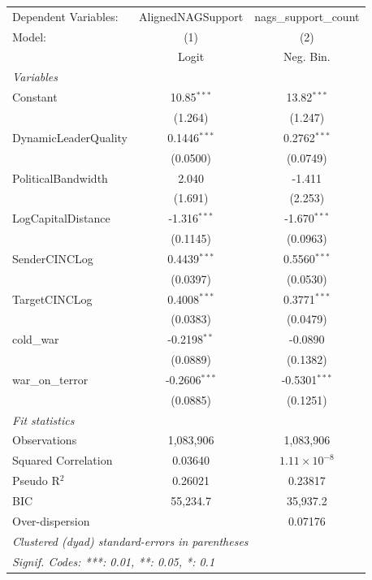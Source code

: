 
\begingroup
\centering
\begin{tabular}{lcc}
   \tabularnewline \midrule \midrule
   Dependent Variables: & AlignedNAGSupport & nags\_support\_count\\    
   Model:               & (1)               & (2)\\  
                        &  Logit            & Neg. Bin.\\  
   \midrule
   \emph{Variables}\\
   Constant             & 10.85$^{***}$     & 13.82$^{***}$\\   
                        & (1.264)           & (1.247)\\   
   DynamicLeaderQuality & 0.1446$^{***}$    & 0.2762$^{***}$\\   
                        & (0.0500)          & (0.0749)\\   
   PoliticalBandwidth   & 2.040             & -1.411\\   
                        & (1.691)           & (2.253)\\   
   LogCapitalDistance   & -1.316$^{***}$    & -1.670$^{***}$\\   
                        & (0.1145)          & (0.0963)\\   
   SenderCINCLog        & 0.4439$^{***}$    & 0.5560$^{***}$\\   
                        & (0.0397)          & (0.0530)\\   
   TargetCINCLog        & 0.4008$^{***}$    & 0.3771$^{***}$\\   
                        & (0.0383)          & (0.0479)\\   
   cold\_war            & -0.2198$^{**}$    & -0.0890\\   
                        & (0.0889)          & (0.1382)\\   
   war\_on\_terror      & -0.2606$^{***}$   & -0.5301$^{***}$\\   
                        & (0.0885)          & (0.1251)\\   
   \midrule
   \emph{Fit statistics}\\
   Observations         & 1,083,906         & 1,083,906\\  
   Squared Correlation  & 0.03640           & $1.11\times 10^{-8}$\\   
   Pseudo R$^2$         & 0.26021           & 0.23817\\  
   BIC                  & 55,234.7          & 35,937.2\\  
   Over-dispersion      &                   & 0.07176\\  
   \midrule \midrule
   \multicolumn{3}{l}{\emph{Clustered (dyad) standard-errors in parentheses}}\\
   \multicolumn{3}{l}{\emph{Signif. Codes: ***: 0.01, **: 0.05, *: 0.1}}\\
\end{tabular}
\par\endgroup


